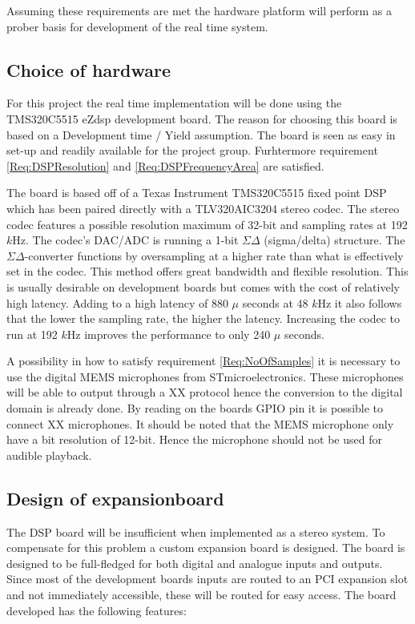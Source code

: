 Assuming these requirements are met the hardware platform will perform as a prober basis for development of the real time system.

\subsection{Choice of hardware}\label{subsec:ChoiceOfHardware}

For this project the real time implementation will be done using the TMS320C5515 eZdsp development board. The reason for choosing this board is based on a Development time / Yield assumption. The board is seen as easy in set-up and readily available for the project group. Furhtermore requirement \ref{Req:DSPResolution} and \ref{Req:DSPFrequencyArea} are satisfied.

The board is based off of a Texas Instrument TMS320C5515 fixed point DSP which has been paired directly with a TLV320AIC3204 stereo codec. The stereo codec features a possible resolution maximum of 32-bit and sampling rates at 192 $k$Hz. The codec's DAC/ADC is running a 1-bit $\Sigma\Delta$ (sigma/delta) structure. The $\Sigma\Delta$-converter functions by oversampling at a higher rate than what is effectively set in the codec. This method offers great bandwidth and flexible resolution. This is usually desirable on development boards but comes with the cost of relatively high latency. Adding to a high latency of 880 $\mu$ seconds at 48 $k$Hz it also follows that the lower the sampling rate, the higher the latency. Increasing the codec to run at 192 $k$Hz improves the performance to only 240 $\mu$ seconds.

A possibility in how to satisfy requirement \ref{Req:NoOfSamples} it is necessary to use the digital MEMS microphones from STmicroelectronics. These microphones will be able to output through a XX protocol hence the conversion to the digital domain is already done. By reading on the boards GPIO pin it is possible to connect XX microphones. It should be noted that the MEMS microphone only have a bit resolution of 12-bit. Hence the microphone should not be used for audible playback.


\subsection{Design of expansionboard}\label{subsec:DesignOfExpansion}

The DSP board will be insufficient when implemented as a stereo system. To compensate for this problem a custom expansion board is designed. The board is designed to be full-fledged for both digital and analogue inputs and outputs. Since most of the development boards inputs are routed to an PCI expansion slot and not immediately accessible, these will be routed for easy access. The board developed has the following features:

